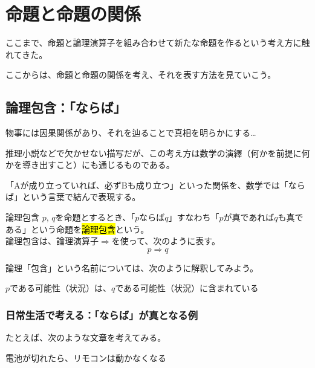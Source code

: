 \documentclass[../../imaging-math]{subfiles}
\begin{document}
\section{命題と命題の関係}

ここまで、命題と論理演算子を組み合わせて新たな命題を作るという考え方に触れてきた。

ここからは、命題と命題の関係を考え、それを表す方法を見ていこう。

\subsection{論理包含：「ならば」}

物事には因果関係があり、それを辿ることで真相を明らかにする…

推理小説などで欠かせない描写だが、この考え方は数学の演繹（何かを前提に何かを導き出すこと）にも通じるものである。

\br

「Aが成り立っていれば、必ずBも成り立つ」といった関係を、数学では「ならば」という言葉で結んで表現する。

\begin{definition}{論理包含}
  \titlegap
  $p,\,q$を命題とするとき、「$p$ならば$q$」すなわち「$p$が真であれば$q$も真である」という命題を\hl{論理包含}という。\\
  論理包含は、論理演算子$\Rightarrow$を使って、次のように表す。
  \LARGE
  \begin{equation*}
    p \Rightarrow q
  \end{equation*}
\end{definition}

論理「包含」という名前については、次のように解釈してみよう。

\begin{emphabox}
  \begin{spacebox}
    \begin{center}
      $p$である可能性（状況）は、$q$である可能性（状況）に含まれている
    \end{center}
  \end{spacebox}
\end{emphabox}

\subsubsection{日常生活で考える：「ならば」が真となる例}

たとえば、次のような文章を考えてみる。

\begin{center}
  電池が切れたら、リモコンは動かなくなる
\end{center}
\end{document}
